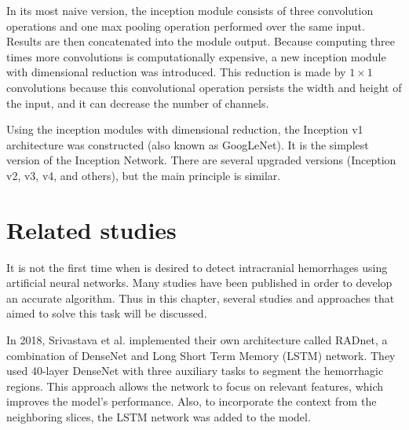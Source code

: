 \documentclass[thesis=B,english]{FITthesis}[2019/12/23]
\begin{document}
In its most naive version, the inception module consists of three convolution operations and one max pooling operation performed over the same input. Results are then concatenated into the module output. Because computing three times more convolutions is computationally expensive, a new inception module with dimensional reduction was introduced. This reduction is made by $1\times1$ convolutions because this convolutional operation persists the width and height of the input, and it can decrease the number of channels. %

%
Using the inception modules with dimensional reduction, the Inception v1 architecture was constructed (also known as GoogLeNet). It is the simplest version of the Inception Network.\cite{DBLP:journals/corr/SzegedyLJSRAEVR14} There are several upgraded versions (Inception v2, v3, v4, and others), but the main principle is similar. 


\chapter{Related studies}
\label{chap:related_studies}
It is not the first time when is desired to detect intracranial hemorrhages using artificial neural networks. Many studies have been published in order to develop an accurate algorithm. Thus in this chapter, several studies and approaches that aimed to solve this task will be discussed.

In 2018, Srivastava et al. \cite{DBLP:1710-04934} implemented their own architecture called RADnet, a combination of DenseNet and Long Short Term Memory (LSTM) network. They used 40-layer DenseNet with three auxiliary tasks to segment the hemorrhagic regions. This approach allows the network to focus on relevant features, which improves the model's performance. Also, to incorporate the context from the neighboring slices, the LSTM network was added to the model. 
\end{document}

